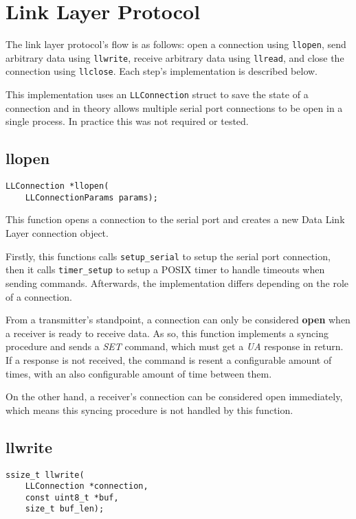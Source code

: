 \documentclass[11pt,a4paper,twocolumn]{article}
\begin{document}
\section{Link Layer Protocol}

The link layer protocol's flow is as follows: open a connection using \lstinline{llopen}, send arbitrary data using \lstinline{llwrite}, receive arbitrary data using \lstinline{llread}, and close the connection using \lstinline{llclose}.
Each step's implementation is described below.

This implementation uses an \lstinline{LLConnection} struct to save the state of a connection and in theory allows multiple serial port connections to be open in a single process.
In practice this was not required or tested.

\subsection{llopen}

\begin{lstlisting}
LLConnection *llopen(
    LLConnectionParams params);
\end{lstlisting}

This function opens a connection to the serial port and creates a new Data Link Layer connection object.

Firstly, this functions calls \lstinline{setup_serial} to setup the serial port connection, then it calls \lstinline{timer_setup} to setup a POSIX timer to handle timeouts when sending commands.
Afterwards, the implementation differs depending on the role of a connection.

From a transmitter's standpoint, a connection can only be considered \textbf{open} when a receiver is ready to receive data.
As so, this function implements a syncing procedure and sends a \textit{SET} command, which must get a \textit{UA} response in return.
If a response is not received, the command is resent a configurable amount of times, with an also configurable amount of time between them.

On the other hand, a receiver's connection can be considered open immediately, which means this syncing procedure is not handled by this function.

\subsection{llwrite}

\begin{lstlisting}
ssize_t llwrite(
    LLConnection *connection, 
    const uint8_t *buf, 
    size_t buf_len);
\end{lstlisting}
\end{document}

